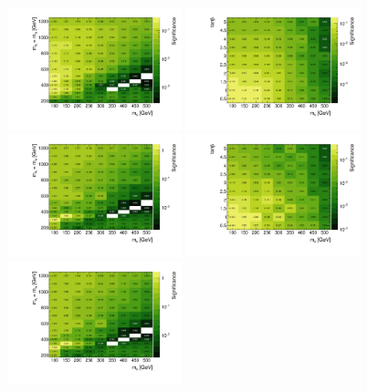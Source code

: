 \begin{figure}
\centering
\includegraphics[width=0.45\textwidth]{texinputs/04_grid/figures/monoz/hadronic/grid_mA_ma_resl_bin100_sign_type3_bkg_uncert_0p10.pdf}
\includegraphics[width=0.45\textwidth]{texinputs/04_grid/figures/monoz/hadronic/grid_tanb_ma_resl_bin100_sign_type3_bkg_uncert_0p10.pdf}
\includegraphics[width=0.45\textwidth]{texinputs/04_grid/figures/monoz/hadronic/grid_mA_ma_merged_bin100_sign_type3_bkg_uncert_0p10.pdf}
\includegraphics[width=0.45\textwidth]{texinputs/04_grid/figures/monoz/hadronic/grid_tanb_ma_merged_bin100_sign_type3_bkg_uncert_0p10.pdf}
\includegraphics[width=0.45\textwidth]{texinputs/04_grid/figures/monoz/hadronic/grid_mA_ma_sum_bin100_sign_type3_bkg_uncert_0p10.pdf}

\end{figure}
